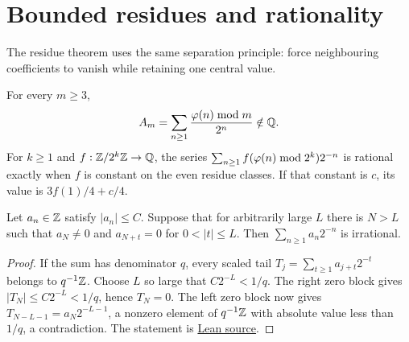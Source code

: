 \documentclass[11pt]{article}
\begin{document}
\section{Bounded residues and rationality}\label{sec:family}
The residue theorem uses the same separation principle: force neighbouring
coefficients to vanish while retaining one central value.

\begin{theorem}\label{res:residueseries}
For every $m\ge3$,
\[
 A_m=\sum_{n\ge1}\frac{\varphi(n)\bmod m}{2^n}\notin\mathbb{Q}.
\]
For $k\ge1$ and $f:\mathbb{Z}/2^k\mathbb{Z}\to\mathbb{Q}$, the series
$\sum_{n\ge1}f(\varphi(n)\bmod2^k)2^{-n}$ is rational exactly when $f$ is
constant on the even residue classes. If that constant is $c$, its value is
$3f(1)/4+c/4$.
\end{theorem}

\begin{lemma}\label{lem:bounded-pulse}
Let $a_n\in\mathbb{Z}$ satisfy $|a_n|\le C$. Suppose that for arbitrarily large $L$
there is $N>L$ such that $a_N\ne0$ and
$a_{N+t}=0$ for $0<|t|\le L$. Then $\sum_{n\ge1}a_n2^{-n}$ is irrational.
\end{lemma}
\begin{proof}
If the sum has denominator $q$, every scaled tail
$T_j=\sum_{t\ge1}a_{j+t}2^{-t}$ belongs to $q^{-1}\mathbb{Z}$.
Choose $L$ so large that $C2^{-L}<1/q$.
The right zero block gives $|T_N|\le C2^{-L}<1/q$, hence $T_N=0$.
The left zero block now gives
$T_{N-L-1}=a_N2^{-L-1}$, a nonzero element of $q^{-1}\mathbb{Z}$ with absolute
value less than $1/q$, a contradiction. The statement is
\href{https://github.com/wcook04/plectis-erdos/blob/f36a98bf3d3e6f65f1074e3b800e3293d5b8a51a/ErdosProblems/Erdos249/PaperCompleteR7/PeriodicAndPulse.lean#L106}{Lean source}.
\end{proof}
\end{document}
